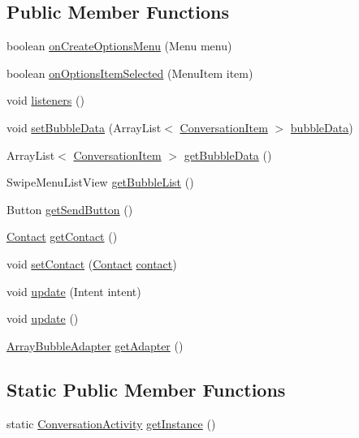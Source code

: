 \subsection*{Public Member Functions}
\begin{DoxyCompactItemize}
\item 
boolean \hyperlink{a00007_a8f7d87763ddaf085205a54e8477ecfce}{on\+Create\+Options\+Menu} (Menu menu)
\item 
boolean \hyperlink{a00007_a37a55c533c74b60c0290ef1329d74e65}{on\+Options\+Item\+Selected} (Menu\+Item item)
\item 
void \hyperlink{a00007_a92b8e0730130e1184a8cdbd89590779d}{listeners} ()
\item 
void \hyperlink{a00007_a1e3fee8580ec4092ffc6e3ce9d44f2b9}{set\+Bubble\+Data} (Array\+List$<$ \hyperlink{a00008}{Conversation\+Item} $>$ \hyperlink{a00007_a68544a0bda28776dfb51718a3c71bf69}{bubble\+Data})
\item 
Array\+List$<$ \hyperlink{a00008}{Conversation\+Item} $>$ \hyperlink{a00007_ac8e14177e6079becbb8bc1f8b35197e0}{get\+Bubble\+Data} ()
\item 
Swipe\+Menu\+List\+View \hyperlink{a00007_af293d3ea5f145650e06a96d2bae482da}{get\+Bubble\+List} ()
\item 
Button \hyperlink{a00007_a57576f3fc93bfa5a685ed5ee30fe113c}{get\+Send\+Button} ()
\item 
\hyperlink{a00005}{Contact} \hyperlink{a00007_adb647c7ae09f1d5755db63d701968925}{get\+Contact} ()
\item 
void \hyperlink{a00007_abef3c7b6635dc06ac6b8e4b37c51b37f}{set\+Contact} (\hyperlink{a00005}{Contact} \hyperlink{a00007_a3459849ab29ad684658dbcd0cf8c5d5a}{contact})
\item 
void \hyperlink{a00007_aa2825578f585a8a32958eaf0ce8df7b8}{update} (Intent intent)
\item 
void \hyperlink{a00007_ac5c54df7ed3b930268c8d7752c101725}{update} ()
\item 
\hyperlink{a00002}{Array\+Bubble\+Adapter} \hyperlink{a00007_a06738816ea7799569af8fa119bb49f7e}{get\+Adapter} ()
\end{DoxyCompactItemize}
\subsection*{Static Public Member Functions}
\begin{DoxyCompactItemize}
\item 
static \hyperlink{a00007}{Conversation\+Activity} \hyperlink{a00007_a7ebafa56e442a2f16c4afe044e65695b}{get\+Instance} ()
\end{DoxyCompactItemize}
